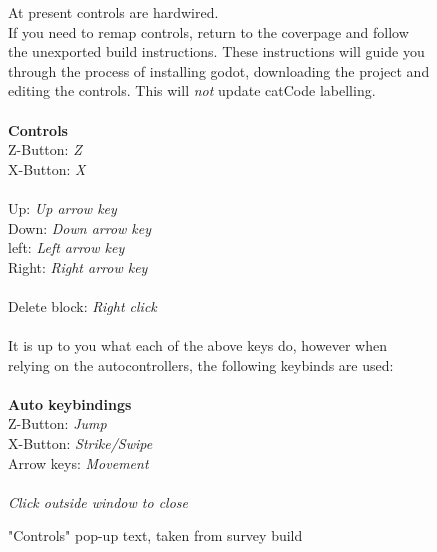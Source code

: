 \begin{figure}[h]
    \centering
    \begin{tcolorbox}[boxrule=0.25mm]
        At present controls are hardwired.\\
        If you need to remap controls, return to the coverpage and follow the unexported build instructions. These instructions will guide you through the process of installing godot, downloading the project and editing the controls. This will \textit{not} update catCode labelling.\\
        \phantom{-} \\
        \textbf{Controls}\\
        Z-Button: \textit{Z}\\
        X-Button: \textit{X}\\
        \phantom{-} \\
        Up: \textit{Up arrow key}\\
        Down: \textit{Down arrow key}\\
        left: \textit{Left arrow key}\\
        Right: \textit{Right arrow key}\\
        \phantom{-} \\
        Delete block: \textit{Right click}\\
        \phantom{-} \\
        It is up to you what each of the above keys do, however when relying on the autocontrollers, the following keybinds are used:\\
        \phantom{-} \\
        \textbf{Auto keybindings}\\
        Z-Button: \textit{Jump}\\
        X-Button: \textit{Strike/Swipe}\\
        Arrow keys: \textit{Movement}\\
        \phantom{-} \\
        \textit{Click outside window to close}
    \end{tcolorbox}
    \caption[Controls pop-up text]{"Controls" pop-up text, taken from survey build}
    \label{fig:catCodeSpec/control}
\end{figure}